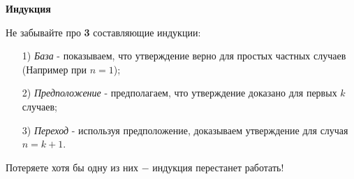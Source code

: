 \documentclass{article}
\begin{document}
\large
	
	
	\begin{center}
		\textbf{Индукция}
	\end{center}
	
	Не забывайте про \textbf{3} составляющие индукции:
	\begin{enumerate}
		\item[1)] \textit{База} - показываем, что утверждение верно для простых частных случаев (Например при $n = 1$);
		
		\item[2)] \textit{Предположение} - предполагаем, что утверждение доказано для первых $k$ случаев;
		
		\item[3)] \textit{Переход} - используя предположение, доказываем утверждение для случая $n = k + 1$.
		
	\end{enumerate}
	
	Потеряете хотя бы одну из них $-$ индукция перестанет работать!
	
\end{document}
